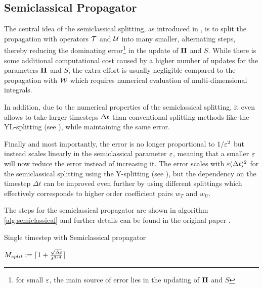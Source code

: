 \subsection{Semiclassical Propagator}
\label{sub:semiclassical_propagator}
%
The central idea of the semiclassical splitting, as introduced in \cite{GH_convsemiclassical},
is to split the propagation with operators $\mathcal{T}$ and $\mathcal{U}$ into many smaller, alternating steps, thereby reducing the dominating error\footnote{for small $\varepsilon$,
the main source of error lies in the updating of $\bm{\Pi}$ and $S$} in the update of $\bm{\Pi}$ and $S$.
While there is some additional computational cost caused by a higher number of updates for the parameters $\bm{\Pi}$ and $S$, the extra effort is usually negligible compared to the propagation with $\mathcal{W}$ which requires numerical evaluation of multi-dimensional integrals. 
\par\medskip
%
In addition, due to the numerical properties of the semiclassical splitting, 
it even allows to take larger timesteps $\Delta t$ than conventional
splitting methods like the YL-splitting (see \cite{GH_convsemiclassical}), while maintaining the same error.
\par\medskip
%
Finally and most importantly, the error is no longer proportional to $1/\varepsilon^2$ but instead
scales linearly in the semiclassical parameter $\varepsilon$,
meaning that a smaller $\varepsilon$ will now reduce the error instead of increasing it.
The error scales with $\varepsilon (\Delta t)^2$ for the semiclassical splitting using the Y-splitting (see \cite{GH_convsemiclassical}),
but the dependency on the timestep $\Delta t$ can be improved even further by using different
splittings which effectively corresponds to higher order coefficient pairs $w_T$ and $w_U$.
\par\medskip
%
The steps for the semiclassical propagator are shown in algorithm \ref{alg:semiclassical} and 
further details can be found in the original paper \cite{GH_convsemiclassical}.
%
\begin{algorithm}[ht]
	\caption{Single timestep with Semiclassical propagator}
	\label{alg:semiclassical}
	\begin{algorithmic}
	\State
		\State
		\State $M_{split} := \lceil 1 + \frac{\sqrt{\Delta t}}{\varepsilon^{3/4}} \rceil$
		\State
		\State {}
		\State {}
		\State {}
		\State
	\EndProcedure
	\end{algorithmic}
\end{algorithm}


